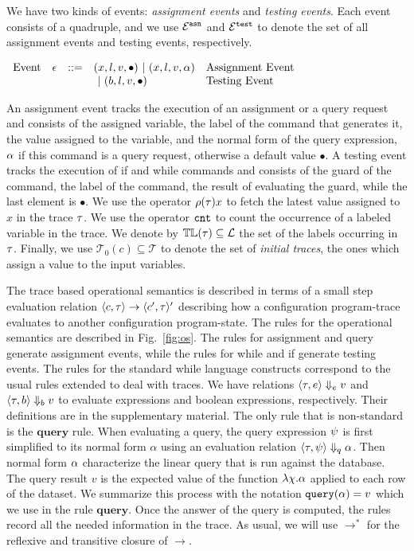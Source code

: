 We have two kinds of events: \emph{assignment events} and \emph{testing events}. 
Each event consists of a quadruple,
and we use $\mathcal{E}^{\mathtt{{asn}}}$ and $\mathcal{E}^{\mathtt{{test}}}$ to denote the set of all assignment events and testing events, respectively.
\begin{center}
$ \begin{array}{lllll}
\mbox{Event} 
& \mathtt{\epsilon} & ::= & 
({x}, l, v, \bullet) ~|~ ({x}, l, v, \alpha)  & \mbox{Assignment Event} \\
&&& ~|~(b, l, v, \bullet)  & \mbox{Testing Event}
\\
\end{array}$
\end{center}
An assignment event tracks the execution of an assignment  or a query request and consists of the assigned variable, the label of the command that generates it, the value assigned to the variable, and the normal form of the query expression, $\alpha$ if this command is a query request, otherwise a default value $\bullet$.
A testing event tracks the execution of if and while commands and consists of the guard of the command, the label of the command, the result of evaluating the guard, while the last element is $\bullet$.  We use the operator $\rho (\mathtt{\tau}) x$ to fetch the latest value assigned to  $x$ in the trace $\mathtt{\tau}$. We use the operator
$\mathtt{cnt}$ to count the occurrence of a labeled variable in the trace.
We denote by $\mathbb{TL}(\mathtt{\tau}) \subseteq \mathcal{L}$ the set of the labels occurring in $\mathtt{\tau}$.
Finally, we use $\mathcal{T}_0(c) \subseteq \mathcal{T}$ to denote the set of \emph{initial traces}, the ones
which assign a value to the input variables. 




The trace based operational semantics is described in terms of a small step evaluation relation
$\langle c, \mathtt{\tau} \rangle \to \langle c', \mathtt{\tau} \rangle'$  describing how a configuration program-trace evaluates to another
configuration program-state. The rules for the operational semantics are described in Fig.~\ref{fig:os}.
The rules for assignment and query generate assignment events, while the rules for while and if generate testing events. 
The rules for the standard while language constructs correspond to the usual rules extended to deal with traces. 
We have relations $\langle \mathtt{\tau}, e \rangle \Downarrow_e v $  and $\langle \mathtt{\tau}, b \rangle \Downarrow_b v $  to evaluate expressions and boolean expressions, respectively. Their definitions are in the supplementary material.
The only rule that is non-standard is the $\textbf{query}$ rule. When evaluating a query, the query expression $\psi$ is first simplified to its normal form $\alpha$ using an evaluation relation $\langle \mathtt{\tau}, \psi \rangle \Downarrow_q \alpha$. 
Then normal form $\alpha$ characterize the linear query that is run against the database. The query result $v$ is the expected value of the function $\lambda \chi.\alpha$ applied to each row of the dataset. We summarize this process with the notation ${\tt query}(\alpha) = v$ which we use in the rule $\textbf{query}$. Once the answer of the query is computed, the rules record all the needed information in the trace. As usual, we will use $\to^*$ for the reflexive and transitive closure of $\to$. 

